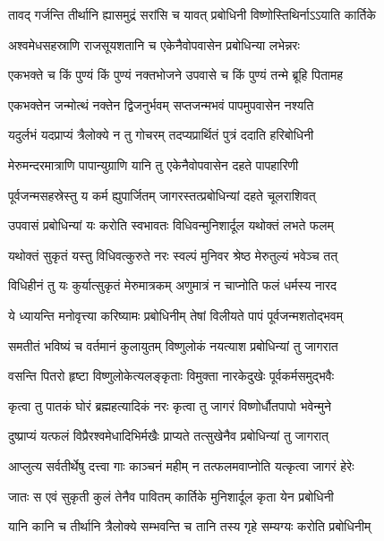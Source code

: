 \twolineshloka
{तावद् गर्जन्ति तीर्थानि ह्यासमुद्रं सरांसि च}
{यावत् प्रबोधिनी विष्णोस्तिथिर्नाऽऽयाति कार्तिके}%

\twolineshloka
{अश्वमेधसहस्राणि राजसूयशतानि च}
{एकेनैवोपवासेन प्रबोधिन्या लभेन्नरः} %


\twolineshloka
{एकभक्ते च किं पुण्यं किं पुण्यं नक्तभोजने}
{उपवासे च किं पुण्यं तन्मे ब्रूहि पितामह} %


\twolineshloka
{एकभक्तेन जन्मोत्थं नक्तेन द्विजनुर्भवम्}
{सप्तजन्मभवं पापमुपवासेन नश्यति} %

\twolineshloka
{यदुर्लभं यदप्राप्यं त्रैलोक्ये न तु गोचरम्}
{तदप्यप्रार्थितं पुत्रं ददाति हरिबोधिनी} %

\twolineshloka
{मेरुमन्दरमात्राणि पापान्युग्राणि यानि तु}
{एकेनैवोपवासेन दहते पापहारिणी} %

\twolineshloka
{पूर्वजन्मसहस्रेस्तु य कर्म ह्युपार्जितम्}
{जागरस्तत्प्रबोधिन्यां दहते चूलराशिवत्} %

\twolineshloka
{उपवासं प्रबोधिन्यां यः करोति स्वभावतः}
{विधिवन्मुनिशार्दूल यथोक्तं लभते फलम्} %

\twolineshloka
{यथोक्तं सुकृतं यस्तु विधिवत्कुरुते नरः}
{स्वल्पं मुनिवर श्रेष्ठ मेरुतुल्यं भवेञ्च तत्} %

\twolineshloka
{विधिहीनं तु यः कुर्यात्सुकृतं मेरुमात्रकम्}
{अणुमात्रं न चाप्नोति फलं धर्मस्य नारद} %

\twolineshloka
{ये ध्यायन्ति मनोवृत्त्या करिष्यामः प्रबोधिनीम्}
{तेषां विलीयते पापं पूर्वजन्मशतोद्भवम्} %

\twolineshloka
{समतीतं भविष्यं च वर्तमानं कुलायुतम्}
{विष्णुलोकं नयत्याश प्रबोधिन्यां तु जागरात} %

\twolineshloka
{वसन्ति पितरो हृष्टा विष्णुलोकेत्यलङ्कृताः}
{विमुक्ता नारकेदुखेः पूर्वकर्मसमुद्भवैः} %

\twolineshloka
{कृत्वा तु पातकं घोरं ब्रह्महत्यादिकं नरः}
{कृत्वा तु जागरं विष्णोर्धौतपापो भवेन्मुने} %

\twolineshloka
{दुष्प्राप्यं यत्फलं विप्रैरश्वमेधादिभिर्मखैः}
{प्राप्यते तत्सुखेनैव प्रबोधिन्यां तु जागरात्} %

\twolineshloka
{आप्लुत्य सर्वतीर्थेषु दत्त्वा गाः काञ्चनं महीम्}
{न तत्फलमवाप्नोति यत्कृत्वा जागरं हेरेः} %

\twolineshloka
{जातः स एवं सुकृती कुलं तेनैव पावितम्}
{कार्तिके मुनिशार्दूल कृता येन प्रबोधिनी} %

\twolineshloka
{यानि कानि च तीर्थानि त्रैलोक्ये सम्भवन्ति च}
{तानि तस्य गृहे सम्यग्यः करोति प्रबोधिनीम्} %

